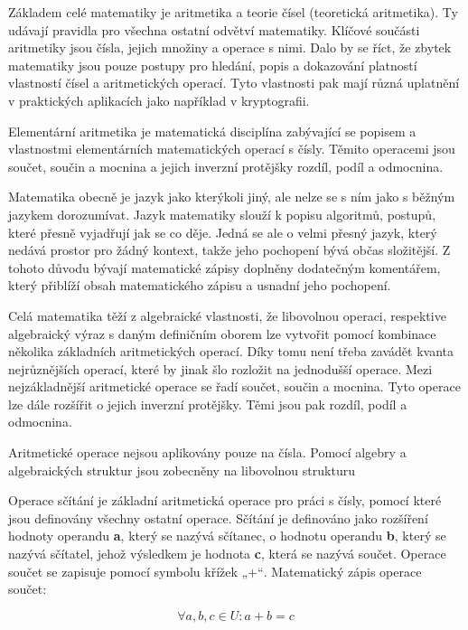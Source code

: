 Základem celé matematiky je aritmetika a teorie čísel (teoretická aritmetika). Ty udávají pravidla pro všechna ostatní odvětví matematiky. Klíčové součásti aritmetiky jsou čísla, jejich množiny a operace s nimi. Dalo by se říct, že zbytek matematiky jsou pouze postupy pro hledání, popis a dokazování platností vlastností čísel a aritmetických operací. Tyto vlastnosti pak mají různá uplatnění v praktických aplikacích jako například v kryptografii.

Elementární aritmetika je matematická disciplína zabývající se popisem a vlastnostmi elementárních matematických operací s čísly. Těmito operacemi jsou součet, součin a mocnina a jejich inverzní protějšky rozdíl, podíl a odmocnina.

Matematika obecně je jazyk jako kterýkoli jiný, ale nelze se s ním jako s běžným jazykem dorozumívat. Jazyk matematiky slouží k popisu algoritmů, postupů, které přesně vyjadřují jak se co děje. Jedná se ale o velmi přesný jazyk, který nedává prostor pro žádný kontext, takže jeho pochopení bývá občas složitější. Z tohoto důvodu bývají matematické zápisy doplněny dodatečným komentářem, který přiblíží obsah matematického zápisu a usnadní jeho pochopení.


Celá matematika těží z algebraické vlastnosti, že libovolnou operaci, respektive algebraický výraz s daným definičním oborem lze vytvořit pomocí kombinace několika základních aritmetických operací. Díky tomu není třeba zavádět kvanta nejrůznějších operací, které by jinak šlo rozložit na jednodušší operace. Mezi nejzákladnější aritmetické operace se řadí součet, součin a mocnina. Tyto operace lze dále rozšířit o jejich inverzní protějšky.  Těmi jsou pak rozdíl, podíl a odmocnina.

Aritmetické operace nejsou aplikovány pouze na čísla. Pomocí algebry a algebraických struktur jsou zobecněny na libovolnou strukturu


Operace sčítání je základní aritmetická operace pro práci s čísly, pomocí které jsou definovány všechny ostatní operace. Sčítání je definováno jako rozšíření hodnoty operandu {\bf a}, který se nazývá sčítanec, o hodnotu operandu {\bf b}, který se nazývá sčítatel, jehož výsledkem je hodnota {\bf c}, která se nazývá součet. Operace součet se zapisuje pomocí symbolu křížek $„+“$. Matematický zápis operace součet:

$$\forall a,b,c \in U: a + b = c $$

